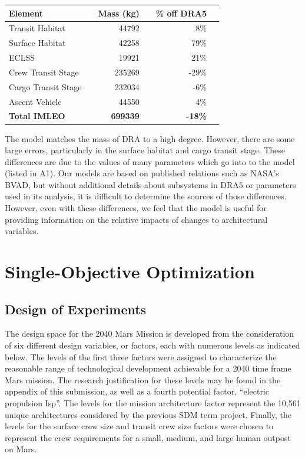 \documentclass[]{aiaa-pretty}
\begin{document}
\begin{center}
	\begin{tabular}{ lc rc rc}
		\textbf{Element} && \textbf{Mass (kg)} && \textbf{\% off DRA5} \\\hline
		Transit Habitat && 44792 && 8\% \\
		Surface Habitat && 42258 && 79\% \\
		ECLSS && 19921 && 21\% \\
		Crew Transit Stage && 235269 && -29\% \\
		Cargo Transit Stage && 232034 && -6\% \\
		Ascent Vehicle && 44550 && 4\% \\
		\textbf{Total IMLEO} && \textbf{699339} && \textbf{-18\%} \\
	\end{tabular}
\end{center}
The model matches the mass of DRA to a high degree. However, there are some large errors, particularly in the surface habitat and cargo transit stage. These differences are due to the values of many parameters which go into to the model (listed in A1). Our models are based on published relations such as NASA's BVAD, but without additional details about subsystems in DRA5 or parameters used in its analysis, it is difficult to determine the sources of those differences. However, even with these differences, we feel that the model is useful for providing information on the relative impacts of changes to architectural variables. 
\section{Single-Objective Optimization}
\label{sec:single}
\subsection{Design of Experiments}
\label{sec:DOE}
The design space for the 2040 Mars Mission is developed from the consideration of six different design variables, or factors, each with numerous levels as indicated below. The levels of the first three factors were assigned to characterize the reasonable range of technological development achievable for a 2040 time frame Mars mission. The research justification for these levels may be found in the appendix of this submission, as well as a fourth potential factor, “electric propulsion Isp”. The levels for the mission architecture factor represent the 10,561 unique architectures considered by the previous SDM term project. Finally, the levels for the surface crew size and transit crew size factors were chosen to represent the crew requirements for a small, medium, and large human outpost on Mars.
\end{document}
